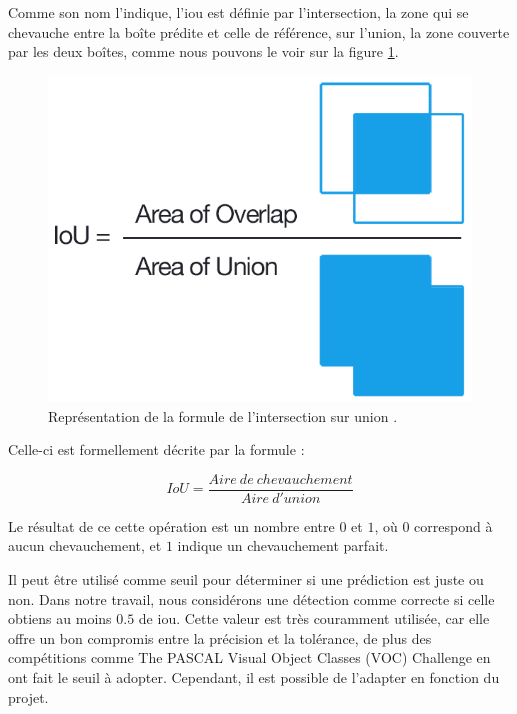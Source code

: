 Comme son nom l'indique, l'\acrshort{iou} est définie par l'intersection, la zone qui se chevauche entre la boîte prédite et celle de référence, sur l'union, la zone couverte par les deux boîtes, comme nous pouvons le voir sur la figure \ref{fig:iou_formula}.

\begin{figure}[hbt!]
    \centering
    \includegraphics[scale=0.5]{Figures/model_evaluation/iou_formula.png}
    \caption{Représentation de la formule de l'intersection sur union \cite{noauthor_jaccard_2023}.}
    \label{fig:iou_formula}
\end{figure}

\break

Celle-ci est formellement décrite par la formule :

\[IoU=\frac{Aire \: de \: chevauchement}{Aire \: d'union}\]

Le résultat de ce cette opération est un nombre entre $0$ et $1$, où $0$ correspond à aucun chevauchement, et $1$ indique un chevauchement parfait.

Il peut être utilisé comme seuil pour déterminer si une prédiction est juste ou non. Dans notre travail, nous considérons une détection comme correcte si celle obtiens au moins $0.5$ de \acrshort{iou}. Cette valeur est très couramment utilisée, car elle offre un bon compromis entre la précision et la tolérance, de plus des compétitions comme The PASCAL Visual Object Classes (VOC) Challenge \cite{everingham_pascal_2010} en ont fait le seuil à adopter. Cependant, il est possible de l'adapter en fonction du projet.

